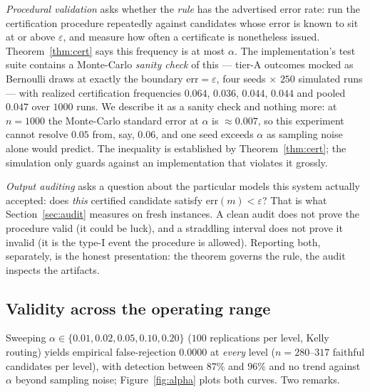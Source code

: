 \documentclass[pdflatex,sn-mathphys-num]{sn-jnl}
\theoremstyle{thmstyleone}
\theoremstyle{thmstyletwo}
\begin{document}
\emph{Procedural validation} asks whether the \emph{rule} has the
advertised error rate: run the certification procedure repeatedly
against candidates whose error is known to sit at or above
$\varepsilon$, and measure how often a certificate is nonetheless
issued. Theorem~\ref{thm:cert} says this frequency is at most
$\alpha$. The implementation's test suite contains a Monte-Carlo
\emph{sanity check} of this --- tier-A outcomes mocked as Bernoulli
draws at exactly the boundary $\mathrm{err} = \varepsilon$, four
seeds $\times$ $250$ simulated runs --- with realized certification
frequencies $0.064$, $0.036$, $0.044$, $0.044$ and pooled $0.047$
over $1000$ runs. We describe it as a sanity check and nothing more:
at $n = 1000$ the Monte-Carlo standard error at $\alpha$ is
${\approx}0.007$, so this experiment cannot resolve $0.05$ from,
say, $0.06$, and one seed exceeds $\alpha$ as sampling noise alone
would predict. The inequality is established by
Theorem~\ref{thm:cert}; the simulation only guards against an
implementation that violates it grossly.

\emph{Output auditing} asks a question about the particular models
this system actually accepted: does \emph{this} certified candidate
satisfy $\mathrm{err}(m) < \varepsilon$? That is what
Section~\ref{sec:audit} measures on fresh instances. A clean audit
does not prove the procedure valid (it could be luck), and a
straddling interval does not prove it invalid (it is the type-I event
the procedure is allowed). Reporting both, separately, is the honest
presentation: the theorem governs the rule, the audit inspects the
artifacts.

\subsection{Validity across the operating range}\label{sec:alpha}

Sweeping $\alpha \in \{0.01, 0.02, 0.05, 0.10, 0.20\}$ ($100$
replications per level, Kelly routing) yields empirical
false-rejection $0.0000$ at \emph{every} level
($n = 280$--$317$ faithful candidates per level), with
detection between $87\%$ and $96\%$ and no trend against $\alpha$
beyond sampling noise; Figure~\ref{fig:alpha} plots both
curves. Two remarks.
\end{document}
